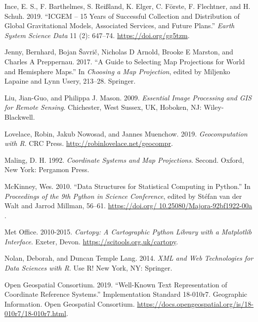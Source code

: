 \documentclass[
  letterpaper,
]{krantz}
\newlength{\cslhangindent}
\newenvironment{CSLReferences}[2] %
 {\begin{list}{}{%
  \setlength{\itemindent}{0pt}
  \setlength{\leftmargin}{0pt}
  \setlength{\parsep}{0pt}
  \ifodd #1
   \setlength{\leftmargin}{\cslhangindent}
   \setlength{\itemindent}{-1\cslhangindent}
  \fi
  \setlength{\itemsep}{#2\baselineskip}}}
 {\end{list}}
\begin{document}
\begin{CSLReferences}{1}{0}
Ince, E. S., F. Barthelmes, S. Reißland, K. Elger, C. Förste, F.
Flechtner, and H. Schuh. 2019. {``{ICGEM} -- 15 Years of Successful
Collection and Distribution of Global Gravitational Models, Associated
Services, and Future Plans.''} \emph{Earth System Science Data} 11 (2):
647--74. \url{https://doi.org/gg5tzm}.

Jenny, Bernhard, Bojan Šavrič, Nicholas D Arnold, Brooke E Marston, and
Charles A Preppernau. 2017. {``A Guide to Selecting Map Projections for
World and Hemisphere Maps.''} In \emph{Choosing a {Map Projection}},
edited by Miljenko Lapaine and Lynn Usery, 213--28. {Springer}.

Liu, Jian-Guo, and Philippa J. Mason. 2009. \emph{Essential Image
Processing and {GIS} for Remote Sensing}. {Chichester, West Sussex, UK,
Hoboken, NJ}: {Wiley-Blackwell}.

Lovelace, Robin, Jakub Nowosad, and Jannes Muenchow. 2019.
\emph{Geocomputation with {R}}. {CRC Press}.
\url{http://robinlovelace.net/geocompr}.

Maling, D. H. 1992. \emph{Coordinate Systems and Map Projections}.
Second. {Oxford, New York}: {Pergamon Press}.

McKinney, Wes. 2010. {``{D}ata {S}tructures for {S}tatistical
{C}omputing in {P}ython.''} In \emph{{P}roceedings of the 9th {P}ython
in {S}cience {C}onference}, edited by Stéfan van der Walt and Jarrod
Millman, 56--61.
\href{https://doi.org/\%2010.25080/Majora-92bf1922-00a\%20}{https://doi.org/
10.25080/Majora-92bf1922-00a }.

Met Office. 2010-2015. \emph{Cartopy: A Cartographic Python Library with
a Matplotlib Interface}. Exeter, Devon.
\url{https://scitools.org.uk/cartopy}.

Nolan, Deborah, and Duncan Temple Lang. 2014. \emph{{XML} and Web
Technologies for Data Sciences with {R}}. Use {R}! {New York, NY}:
{Springer}.

Open Geospatial Consortium. 2019. {``Well-Known Text Representation of
Coordinate Reference Systems.''} Implementation Standard 18-010r7.
Geographic Information. {Open Geospatial Consortium}.
\url{https://docs.opengeospatial.org/is/18-010r7/18-010r7.html}.


\end{CSLReferences}
\end{document}
